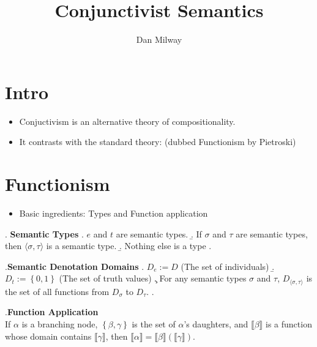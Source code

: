 \documentclass[letterpaper]{article}
\title{Conjunctivist Semantics}
\author{Dan Milway}
\begin{document}
\section{Intro}
\begin{itemize}
  \item Conjuctivism is an alternative theory of compositionality. \parencite{pietroski2005events,pietroski2011minimal}
  \item It contrasts with the standard theory: \textcite{heimkratzer1998semantics} (dubbed Functionism by Pietroski)
\end{itemize}
\section{Functionism}
\begin{itemize}
  \item Basic ingredients: Types and Function application
\end{itemize}
\ex. \textbf{Semantic Types} \parencite{heimkratzer1998semantics}
\a. $e$ and $t$ are semantic types.
\b. If $\sigma$ and $\tau$ are semantic types, then $\langle\sigma,\tau\rangle$ is a semantic type.
\b. Nothing else is a type
\z.

\ex.\textbf{Semantic Denotation Domains} \parencite{heimkratzer1998semantics}
\a. $D_e := D$ (The set of individuals)
\b. $D_t := \left\{ 0,1 \right\}$ (The set of truth values)
\c. For any semantic types $\sigma$ and $\tau$, $D_{\langle\sigma,\tau\rangle}$ is the set of all functions from $D_\sigma$ to $D_\tau$.
\z.

\ex.\textbf{Function Application} \parencite{heimkratzer1998semantics}\\
If $\alpha$ is a branching node, $\left\{ \beta, \gamma \right\}$ is the set of $\alpha$'s daughters, and $\llbracket\beta\rrbracket$ is a function whose domain contains $\llbracket\gamma\rrbracket$, then $\llbracket\alpha\rrbracket = \llbracket\beta\rrbracket(\llbracket\gamma\rrbracket)$.
\end{document}
